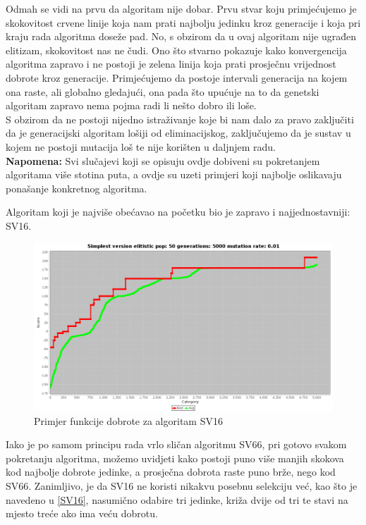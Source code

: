 \documentclass[times, utf8, zavrsni]{fer}
\begin{document}
Odmah se vidi na prvu da algoritam nije dobar. Prvu stvar koju primjećujemo je skokovitost crvene linije koja nam prati najbolju jedinku kroz generacije i koja pri kraju rada algoritma doseže pad. No, s obzirom da u ovaj algoritam nije ugrađen elitizam, skokovitost nas ne čudi. Ono što stvarno pokazuje kako konvergencija algoritma zapravo i ne postoji je zelena linija koja prati prosječnu vrijednost dobrote kroz generacije. Primjećujemo da postoje intervali generacija na kojem ona raste, ali globalno gledajući, ona pada što upućuje na to da genetski algoritam zapravo nema pojma radi li nešto dobro ili loše.\\
S obzirom da ne postoji nijedno istraživanje koje bi nam dalo za pravo zaključiti da je generacijski algoritam lošiji od eliminacijskog, zaključujemo da je sustav u kojem ne postoji mutacija loš te nije korišten u daljnjem radu. \\
\textbf{Napomena: } Svi slučajevi koji se opisuju ovdje dobiveni su pokretanjem algoritama više stotina puta, a ovdje su uzeti primjeri koji najbolje oslikavaju ponašanje konkretnog algoritma.  

Algoritam koji je najviše obećavao na početku bio je zapravo i najjednostavniji: SV16. 

\begin{figure}[!htb]
	\centering
	\includegraphics[width=18cm]{slike/SV16Hibrid.png}
	\caption{Primjer funkcije dobrote za algoritam SV16}
	\label{fig:sv16-alg-hibrid}
\end{figure} 

Iako je po samom principu rada vrlo sličan algoritmu SV66, pri gotovo svakom pokretanju algoritma, možemo uvidjeti kako postoji puno više manjih skokova kod najbolje dobrote jedinke, a prosječna dobrota raste puno brže, nego kod SV66. Zanimljivo, je da SV16 ne koristi nikakvu posebnu selekciju već, kao što je navedeno u \ref{SV16}, nasumično odabire tri jedinke, križa dvije od tri te stavi na mjesto treće ako ima veću dobrotu. 
\end{document}
